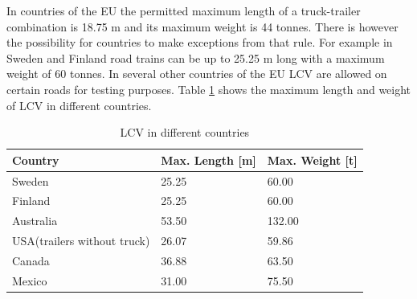 \documentclass[ExampleMasters.tex]{subfiles}
\begin{document}
In countries of the EU the permitted maximum length of a truck-trailer combination is 18.75 m and its maximum weight is 44 tonnes. There is however the possibility for countries to make exceptions from that rule.\cite{96/53/EC}  For example in Sweden and Finland road trains can be up to 25.25 m long with a  maximum weight of 60 tonnes.\cite{Vaegverket}
In several other countries of the EU LCV are allowed on certain roads for testing purposes. 
Table \ref{tab:LCV_in_different_countries} shows the maximum length and weight of LCV in different countries.

\begin{table}[h]
	\centering
	\caption{LCV in different countries\cite{Vaegverket}\cite{LCV_Australia}\Cite{LCV_USA}\cite{LCV_Canada}\Cite{LCV_Mexico}}
	\label{tab:LCV_in_different_countries}
	\begin{tabular}{l|l|l|}
		Country   & Max. Length [m] & Max. Weight [t] \\ \hline
		Sweden    &       25.25      &       60.00      \\
		Finland   &            25.25 &         60.00    \\
		Australia &      53.50       &           132.00  \\
		USA(trailers without truck)&      26.07       &    59.86        \\
		Canada & 36.88 & 63.50 \\
		Mexico & 31.00 & 75.50 \\
	\end{tabular} \\
\end{table}
\end{document}
